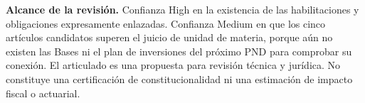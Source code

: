 \textbf{Alcance de la revisión.} Confianza High en la existencia de las habilitaciones y obligaciones expresamente enlazadas. Confianza Medium en que los cinco artículos candidatos superen el juicio de unidad de materia, porque aún no existen las Bases ni el plan de inversiones del próximo PND para comprobar su conexión. El articulado es una propuesta para revisión técnica y jurídica. No constituye una certificación de constitucionalidad ni una estimación de impacto fiscal o actuarial.

\par{}
